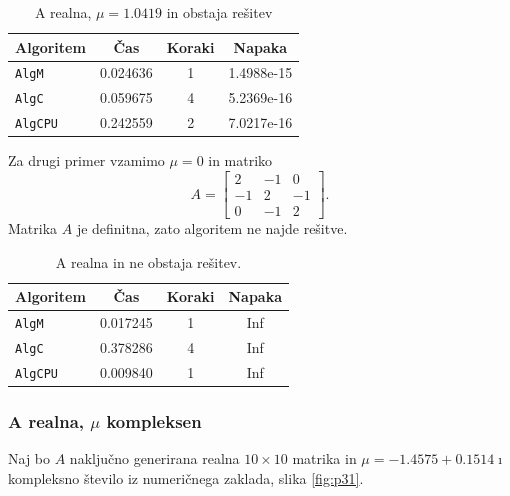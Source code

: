 \documentclass[12pt,a4paper]{amsart}
\theoremstyle{definition}
\theoremstyle{plain}
\begin{document}
\begin{table}[H]
\caption{A realna, $\mu = 1.0419$ in obstaja rešitev}
\begin{tabular}{|l|c|c|c|}
\hline
Algoritem & Čas & Koraki & Napaka\\
\hline
\hline
\verb+AlgM+ &0.024636&1&1.4988e-15\\
\hline
\verb+AlgC+ & 0.059675& 4&5.2369e-16 \\
\hline
\verb+AlgCPU+ &0.242559&2&7.0217e-16 \\
\hline
\end{tabular}
\label{t1}
\end{table}
Za drugi primer vzamimo $\mu =0$ in matriko
\begin{equation*}
A=\begin{bmatrix}
2 &-1&0\\
-1&2&-1\\
0&-1&2
\end{bmatrix}.
\end{equation*}
Matrika $A$ je definitna, zato algoritem ne najde rešitve.

\begin{table}[H]
\caption{A realna in ne obstaja rešitev.}
\begin{tabular}{|l|c|c|c|}
\hline
Algoritem & Čas & Koraki & Napaka\\
\hline
\hline
\verb+AlgM+ &0.017245&1&Inf \\
\hline
\verb+AlgC+ & 0.378286&4 & Inf \\
\hline
\verb+AlgCPU+ &0.009840 &1& Inf\\
\hline
\end{tabular}

\label{t2}
\end{table}
\subsubsection{A realna, $\mu$ kompleksen}


Naj bo $A$ naključno generirana realna $10\times 10$ matrika in $\mu = -1.4575 + 0.1514 \imath$ kompleksno število iz numeričnega zaklada, slika \ref{fig:p31}.
\end{document}
